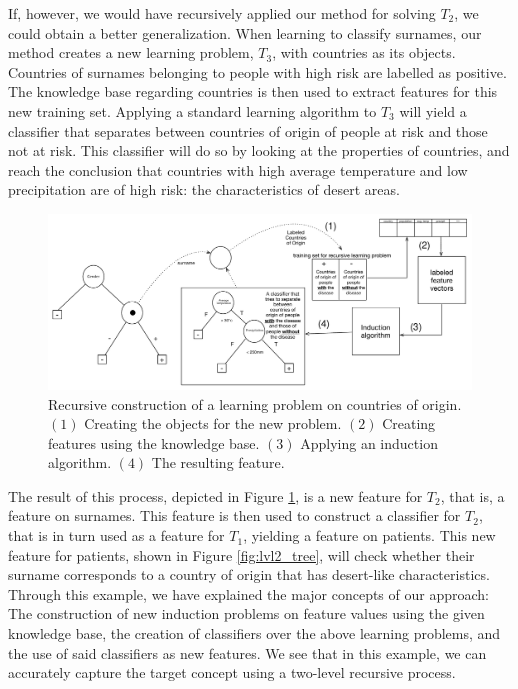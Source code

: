 \documentclass[twoside,11pt]{article}
\theoremstyle{definition}
\begin{document}
If, however, we would have recursively applied our method for solving $T_2$, we could obtain a better generalization.
When learning to classify surnames, our method creates a new learning problem, $T_3$, with countries as its objects. Countries of surnames belonging to people with high risk are labelled as positive. The knowledge base regarding countries is then used to extract features for this new training set.
Applying a standard learning algorithm to $T_3$ will yield a classifier that separates between countries of origin of people at risk and those not at risk. This classifier will do so by looking at the properties of countries, and reach the conclusion that countries with high average temperature and low precipitation are of high risk: the characteristics of desert areas. 

\begin{figure}[th]
	\centering
	\includegraphics[width=0.9\linewidth,height=0.33\linewidth]{fig4_annotated.pdf}
	\caption{Recursive construction of a learning problem on countries of origin. $(1)$ Creating the objects for the new problem. $(2)$ Creating features using the knowledge base. $(3)$ Applying an induction algorithm. $(4)$ The resulting feature.}
	\label{fig:moving_to_lvl2}
\end{figure}

 The result of this process, depicted in Figure \ref{fig:moving_to_lvl2}, is a new feature for $T_2$, that is, a feature on surnames. This feature is then used to construct a classifier for $T_2$, that is in turn used as a feature for $T_1$, yielding a feature on patients. This new feature for patients, shown in Figure \ref{fig:lvl2_tree}, will check whether their surname corresponds to a country of origin that has desert-like characteristics. 
 Through this example, we have explained the major concepts of our approach: The construction of new induction problems on feature values using the given knowledge base, the creation of classifiers over the above learning problems, and the use of said classifiers as new features. We see that in this example, we can accurately capture the target concept using a two-level recursive process.
 
\end{document}
